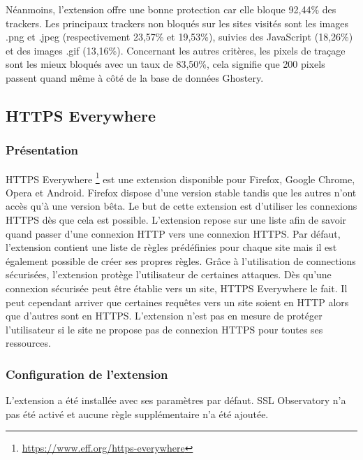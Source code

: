 Néanmoins, l'extension offre une bonne protection car elle bloque 92,44\% des trackers. Les principaux trackers non bloqués sur les sites visités sont les images .png et .jpeg (respectivement 23,57\% et 19,53\%), suivies des JavaScript (18,26\%) et des images .gif (13,16\%).
Concernant les autres critères, les pixels de traçage sont les mieux bloqués avec un taux de 83,50\%, cela signifie que 200 pixels passent quand même à côté de la base de données Ghostery.

\subsection{HTTPS Everywhere}
\subsubsection{Présentation}
HTTPS Everywhere \footnote{\url{https://www.eff.org/https-everywhere}} est une extension disponible pour Firefox, Google Chrome, Opera et Android. Firefox dispose d'une version stable tandis que les autres n'ont accès qu'à une version bêta. Le but de cette extension est d'utiliser les connexions HTTPS dès que cela est possible. L'extension repose sur une liste afin de savoir quand passer d'une connexion HTTP vers une connexion HTTPS. Par défaut, l'extension contient une liste de règles prédéfinies pour chaque site mais il est également possible de créer ses propres règles.
Grâce à l'utilisation de connections sécurisées, l'extension protège l'utilisateur de certaines attaques. Dès qu'une connexion sécurisée peut être établie vers un site, HTTPS Everywhere le fait. Il peut cependant arriver que certaines requêtes vers un site soient en HTTP alors que d'autres sont en HTTPS. L'extension n'est pas en mesure de protéger l'utilisateur si le site ne propose pas de connexion HTTPS pour toutes ses ressources.

\subsubsection{Configuration de l'extension}
L'extension a été installée avec ses paramètres par défaut. SSL Observatory n'a pas été activé et aucune règle supplémentaire n'a été ajoutée.

